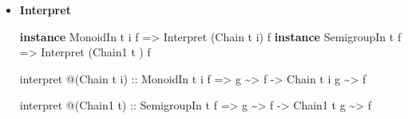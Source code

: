 \documentclass[]{article}
\newenvironment{Shaded}{}{}
\newcommand{\DataTypeTok}[1]{\textcolor[rgb]{0.56,0.13,0.00}{#1}}
\newcommand{\KeywordTok}[1]{\textcolor[rgb]{0.00,0.44,0.13}{\textbf{#1}}}
\newcommand{\NormalTok}[1]{#1}
\newcommand{\OperatorTok}[1]{\textcolor[rgb]{0.40,0.40,0.40}{#1}}
\newcommand{\OtherTok}[1]{\textcolor[rgb]{0.00,0.44,0.13}{#1}}
\renewcommand{\href}[2]{#2\footnote{\url{#1}}}
\begin{document}
\begin{itemize}
  Universally, we can concatenate linked chains, with:

\begin{Shaded}
\begin{Highlighting}[]
\NormalTok{appendChain}
\OtherTok{    ::} \DataTypeTok{Tensor}\NormalTok{ t i}
    \OtherTok{=\textgreater{}}\NormalTok{ t (}\DataTypeTok{Chain}\NormalTok{ t i f) (}\DataTypeTok{Chain}\NormalTok{ t i f) }\OperatorTok{\textasciitilde{}\textgreater{}} \DataTypeTok{Chain}\NormalTok{ t i f}

\NormalTok{appendChain1}
\OtherTok{    ::} \DataTypeTok{Associative}\NormalTok{ t}
    \OtherTok{=\textgreater{}}\NormalTok{ t (}\DataTypeTok{Chain1}\NormalTok{ t f) (}\DataTypeTok{Chain1}\NormalTok{ t f) }\OperatorTok{\textasciitilde{}\textgreater{}} \DataTypeTok{Chain1}\NormalTok{ t f}
\end{Highlighting}
\end{Shaded}

  These operations are associative, and this property is gained from the tensor
  nature of \texttt{t}.

  The construction of \texttt{Chain} is inspired by
  \href{http://oleg.fi/gists/posts/2018-02-21-single-free.html}{Oleg Grenrus's
  blog post}, and the construction of \texttt{Chain1} is inspired by
  implementations of finite automata and iteratees.
\item
  \textbf{Interpret}

\begin{Shaded}
\begin{Highlighting}[]
\KeywordTok{instance} \DataTypeTok{MonoidIn}\NormalTok{    t i f }\OtherTok{=\textgreater{}} \DataTypeTok{Interpret}\NormalTok{ (}\DataTypeTok{Chain}\NormalTok{  t i) f}
\KeywordTok{instance} \DataTypeTok{SemigroupIn}\NormalTok{ t   f }\OtherTok{=\textgreater{}} \DataTypeTok{Interpret}\NormalTok{ (}\DataTypeTok{Chain1}\NormalTok{ t  ) f}

\NormalTok{interpret }\OperatorTok{@}\NormalTok{(}\DataTypeTok{Chain}\NormalTok{ t i)}
\OtherTok{    ::} \DataTypeTok{MonoidIn}\NormalTok{ t i f}
    \OtherTok{=\textgreater{}}\NormalTok{ g }\OperatorTok{\textasciitilde{}\textgreater{}}\NormalTok{ f}
    \OtherTok{{-}\textgreater{}} \DataTypeTok{Chain}\NormalTok{ t i g }\OperatorTok{\textasciitilde{}\textgreater{}}\NormalTok{ f}

\NormalTok{interpret }\OperatorTok{@}\NormalTok{(}\DataTypeTok{Chain1}\NormalTok{ t)}
\OtherTok{    ::} \DataTypeTok{SemigroupIn}\NormalTok{ t f}
    \OtherTok{=\textgreater{}}\NormalTok{ g }\OperatorTok{\textasciitilde{}\textgreater{}}\NormalTok{ f}
    \OtherTok{{-}\textgreater{}} \DataTypeTok{Chain1}\NormalTok{ t g }\OperatorTok{\textasciitilde{}\textgreater{}}\NormalTok{ f}
\end{Highlighting}
\end{Shaded}


\end{itemize}
\end{document}
